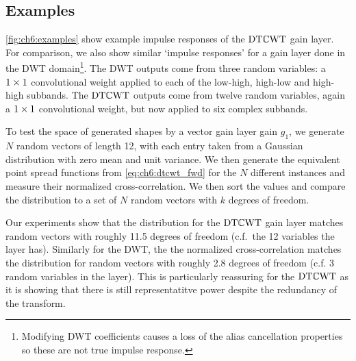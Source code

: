 \subsection{Examples}
\autoref{fig:ch6:examples} show example impulse responses of the $\mathrm{DT}\mathbb{C}\mathrm{WT}$ gain
layer. For comparison, we also show similar `impulse responses' for a gain layer
done in the DWT domain\footnote{Modifying DWT coefficients causes a loss of the
alias cancellation properties so these are not true impulse response.}. The DWT 
outputs come from three random variables: a $1\times 1$ 
convolutional weight applied to each of the low-high, high-low and high-high
subbands. The $\mathrm{DT}\mathbb{C}\mathrm{WT}$ outputs come from twelve random variables, again a $1\times
1$ convolutional weight, but now applied to six complex subbands. 

To test the space of generated shapes by a vector gain layer gain $g_1$, we
generate $N$ random vectors of length 12, with each entry taken
from a Gaussian distribution with zero mean and
unit variance. We then generate the equivalent point spread functions from
\eqref{eq:ch6:dtcwt_fwd} for the $N$ different instances and measure their 
normalized cross-correlation. We then sort the values and compare the
distribution to a set of $N$ random vectors with $k$ degrees of freedom. 

Our experiments show that the distribution for the $\mathrm{DT}\mathbb{C}\mathrm{WT}$ gain layer matches
random vectors with roughly 11.5 degrees of freedom (c.f.\ the 12 variables 
the layer has). 
Similarly for the DWT, the 
the normalized cross-correlation matches the distribution for random vectors
with roughly 2.8 degrees of freedom (c.f. 3 random variables in the layer).
This is particularly reassuring for the $\mathrm{DT}\mathbb{C}\mathrm{WT}$ as it is showing that there is
still representatitve power despite the redundancy of the transform.

\begin{figure}
  \centering
  \newline
  \label{fig:ch6:examples}
\end{figure}


